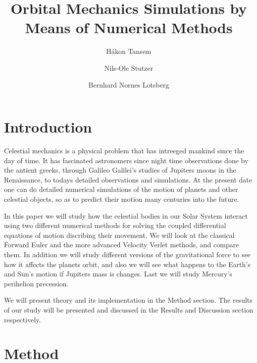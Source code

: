 \documentclass[twocolumn]{aastex62}
\begin{document}
\title{\Large Orbital Mechanics Simulations by Means of Numerical Methods}

\author{Håkon Tansem}

\author{Nils-Ole Stutzer}

\author{Bernhard Nornes Lotsberg}

\begin{abstract}

\end{abstract}

\section{Introduction} \label{sec:intro}
Celestial mechanics is a physical problem that has intreeged mankind since the
day of time. It has fascinated astronomers since night time observations done by
the antient greeks, through Galileo Galilei's studies of Jupiters moons in the
Renaissance, to todays detailed observations and simulations. At the present
date one can do detailed numerical simulations of the motion of planets and
other celestial objects, so as to predict their motion many centuries into the
future.

In this paper we will study how the celestial bodies in our Solar System
interact using two different numerical methods for solving the coupled
differential equations of motion discribing their movement. We will look at the
classical Forward Euler and the more advanced Velocity Verlet methods, and
compare them. In addition we will study different versions of the gravitational
force to see how it affects the planets orbit, and also we will see what happens
to the Earth's and Sun's motion if Jupiters mass is changes. Last we will study
Mercury's perihelion precession.

We will present theory and its implementation in the Method section. The results
of our study will be presented and discussed in the Results and Discussion
section respectively.


\section{Method} \label{sec:method}
\end{document}
